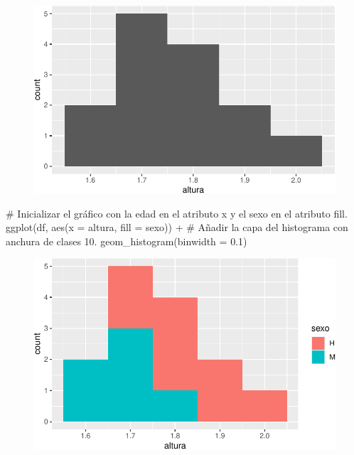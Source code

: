 \documentclass[
  a4paper,
]{scrreport}
\newenvironment{Shaded}{\begin{snugshade}}{\end{snugshade}}
\newcommand{\AttributeTok}[1]{\textcolor[rgb]{0.40,0.45,0.13}{#1}}
\newcommand{\CommentTok}[1]{\textcolor[rgb]{0.37,0.37,0.37}{#1}}
\newcommand{\FloatTok}[1]{\textcolor[rgb]{0.68,0.00,0.00}{#1}}
\newcommand{\FunctionTok}[1]{\textcolor[rgb]{0.28,0.35,0.67}{#1}}
\newcommand{\NormalTok}[1]{\textcolor[rgb]{0.00,0.23,0.31}{#1}}
\newcommand{\SpecialCharTok}[1]{\textcolor[rgb]{0.37,0.37,0.37}{#1}}
\theoremstyle{definition}
\theoremstyle{definition}
\theoremstyle{remark}
\begin{document}
\begin{figure}[H]

{\centering \includegraphics{./07-graficos_files/figure-pdf/unnamed-chunk-16-1.pdf}

}

\end{figure}

\begin{Shaded}
\begin{Highlighting}[]
\CommentTok{\# Inicializar el gráfico con la edad en el atributo x y el sexo en el atributo fill.}
\FunctionTok{ggplot}\NormalTok{(df, }\FunctionTok{aes}\NormalTok{(}\AttributeTok{x =}\NormalTok{ altura, }\AttributeTok{fill =}\NormalTok{ sexo)) }\SpecialCharTok{+}
\CommentTok{\# Añadir la capa del histograma con anchura de clases 10.}
    \FunctionTok{geom\_histogram}\NormalTok{(}\AttributeTok{binwidth =} \FloatTok{0.1}\NormalTok{)}
\end{Highlighting}
\end{Shaded}

\begin{figure}[H]

{\centering \includegraphics{./07-graficos_files/figure-pdf/unnamed-chunk-17-1.pdf}

}

\end{figure}
\end{document}
